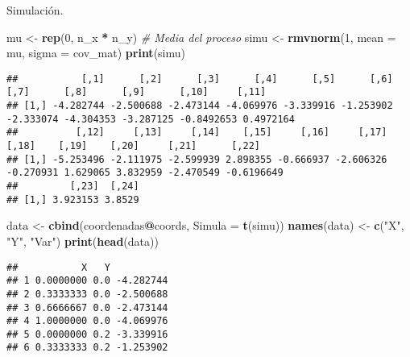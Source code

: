 \documentclass[ignorenonframetext,]{beamer}
\newenvironment{Shaded}{\begin{snugshade}}{\end{snugshade}}
\newcommand{\CommentTok}[1]{\textcolor[rgb]{0.56,0.35,0.01}{\textit{#1}}}
\newcommand{\DataTypeTok}[1]{\textcolor[rgb]{0.13,0.29,0.53}{#1}}
\newcommand{\DecValTok}[1]{\textcolor[rgb]{0.00,0.00,0.81}{#1}}
\newcommand{\KeywordTok}[1]{\textcolor[rgb]{0.13,0.29,0.53}{\textbf{#1}}}
\newcommand{\NormalTok}[1]{#1}
\newcommand{\OperatorTok}[1]{\textcolor[rgb]{0.81,0.36,0.00}{\textbf{#1}}}
\newcommand{\StringTok}[1]{\textcolor[rgb]{0.31,0.60,0.02}{#1}}
\begin{document}
\begin{frame}[fragile]{Simulación.}
\protect\hypertarget{simulaciuxf3n.}{}

\begin{Shaded}
\begin{Highlighting}[]
\NormalTok{mu  <-}\StringTok{ }\KeywordTok{rep}\NormalTok{(}\DecValTok{0}\NormalTok{, n_x }\OperatorTok{*}\StringTok{ }\NormalTok{n_y) }\CommentTok{# Media del proceso}
\NormalTok{simu <-}\StringTok{ }\KeywordTok{rmvnorm}\NormalTok{(}\DecValTok{1}\NormalTok{,}
                \DataTypeTok{mean =}\NormalTok{ mu,}
                \DataTypeTok{sigma =}\NormalTok{ cov_mat)}
\KeywordTok{print}\NormalTok{(simu)}
\end{Highlighting}
\end{Shaded}

\begin{verbatim}
##           [,1]      [,2]      [,3]      [,4]      [,5]      [,6]      [,7]      [,8]      [,9]      [,10]     [,11]
## [1,] -4.282744 -2.500688 -2.473144 -4.069976 -3.339916 -1.253902 -2.333074 -4.304353 -3.287125 -0.8492653 0.4972164
##          [,12]     [,13]     [,14]    [,15]     [,16]     [,17]     [,18]    [,19]    [,20]     [,21]      [,22]
## [1,] -5.253496 -2.111975 -2.599939 2.898355 -0.666937 -2.606326 -0.270931 1.629065 3.832959 -2.470549 -0.6196649
##         [,23]  [,24]
## [1,] 3.923153 3.8529
\end{verbatim}

\begin{Shaded}
\begin{Highlighting}[]
\NormalTok{data <-}\StringTok{ }\KeywordTok{cbind}\NormalTok{(coordenadas}\OperatorTok{@}\NormalTok{coords, }\DataTypeTok{Simula =} \KeywordTok{t}\NormalTok{(simu))}
\KeywordTok{names}\NormalTok{(data) <-}\StringTok{ }\KeywordTok{c}\NormalTok{(}\StringTok{"X"}\NormalTok{, }\StringTok{"Y"}\NormalTok{, }\StringTok{"Var"}\NormalTok{)}
\KeywordTok{print}\NormalTok{(}\KeywordTok{head}\NormalTok{(data))}
\end{Highlighting}
\end{Shaded}

\begin{verbatim}
##           X   Y          
## 1 0.0000000 0.0 -4.282744
## 2 0.3333333 0.0 -2.500688
## 3 0.6666667 0.0 -2.473144
## 4 1.0000000 0.0 -4.069976
## 5 0.0000000 0.2 -3.339916
## 6 0.3333333 0.2 -1.253902
\end{verbatim}

\end{frame}
\end{document}
